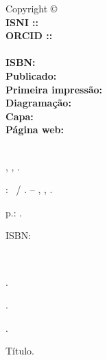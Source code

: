 
\newpage
\thispagestyle{empty}

{\fontsize{0.035\textwidth}{0}

\noindent Copyright \copyright\ \imprimiryear\ \myauthor\\ %
\noindent \textbf{ISNI  ::} \imprimirISNI\\
\noindent \textbf{ORCID ::} \imprimirOrcid\\
~\\
\noindent \textbf{ISBN:} \imprimirisbn\\ %
\noindent \textbf{Publicado:} \imprimireditora\\ %
\noindent \textbf{Primeira impressão:} \imprimiryear\\ %
\noindent \textbf{Diagramação:} \myauthor\\ %
\noindent \textbf{Capa:} \myauthor\\ %
\noindent \textbf{Página web:} \ImprimirLinkHomePageLivro\\ %
~\\
\begin{center}
\begin{catalografica}%
	\myauthorlastname, \myauthorname, \myauthorborn.%

	\hspace{0.5cm} \mytitle: \mysubtitle~/ \myauthor. -- %
	\imprimirlocal, \imprimireditora, \imprimiryear.
	
	\hspace{0.5cm} \pageref{LastPage} p.: \imprimirpapersize.\\ %
	
	\hspace{0.5cm}
	\parbox[t]{\textwidth}{\imprimirtipotrabalho}%

	\hspace{0.5cm}
	\parbox[t]{\textwidth}{ISBN: \imprimirisbn}\\


	\hspace{0.5cm}
	\begin{inparaenum}[1.]
		\item \palavraschavea.
		\item \palavraschaveb.
		\item \palavraschavec.
	\end{inparaenum}
	\begin{inparaenum}[I.]
		\item Título.%
	\end{inparaenum}


\end{catalografica}
\end{center}}
